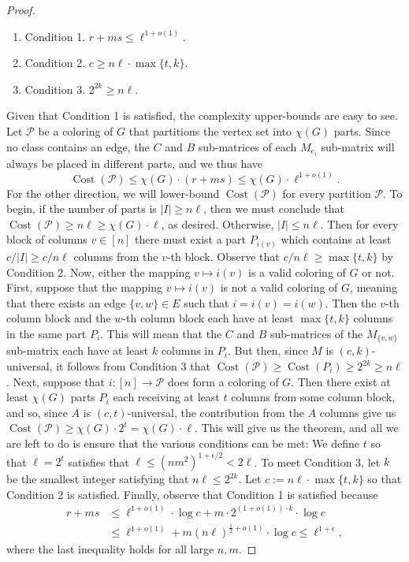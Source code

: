\documentclass[10pt,a4paper]{article}
\begin{document}
\begin{proof}
\begin{enumerate}
\item Condition 1. $r+ms\le\ell^{1+o(1)}$.
\item Condition 2. $c\ge n\ell\cdot\max\{t,k\}$.
\item Condition 3. $2^{2k}\ge n\ell$.
\end{enumerate}
Given that Condition 1 is satisfied, the complexity upper-bounds are easy to see. Let $\mathcal P$ be a coloring of $G$ that partitions the vertex set into $\chi(G)$ parts. Since no class contains an edge, the $C$ and $B$ sub-matrices of each $M_{e_i}$ sub-matrix will always be placed in different parts, and we thus have
\[\operatorname{Cost}(\mathcal P)\le\chi(G)\cdot(r+ms)\le\chi(G)\cdot\ell^{1+o(1)}.\]
For the other direction, we will lower-bound $\operatorname{Cost}(\mathcal P)$ for every partition $\mathcal P$. To begin, if the number of parts is $|I|\ge n\ell$, then we must conclude that $\operatorname{Cost}(\mathcal P)\ge n\ell\ge\chi(G)\cdot\ell$, as desired.
Otherwise, $|I|\le n\ell$. Then for every block of columns $v\in[n]$ there must exist a part $P_{i(v)}$ which contains at least $c/|I|\ge c/n\ell$ columns from the $v$-th block. Observe that $c/n\ell\ge\max\{t,k\}$ by Condition 2.
Now, either the mapping $v\mapsto i(v)$ is a valid coloring of $G$ or not. First, suppose that the mapping $v\mapsto i(v)$ is not a valid coloring of $G$, meaning that there exists an edge $\{v,w\}\in E$ such that $i=i(v)=i(w)$. Then the $v$-th column block and the $w$-th column block each have at least $\max\{t,k\}$ columns in the same part $P_i$. This will mean that the $C$ and $B$ sub-matrices of the $M_{\{v,w\}}$ sub-matrix each have at least $k$ columns in $P_i$. But then, since $M$ is $(c,k)$-universal, it follows from Condition 3 that $\operatorname{Cost}(\mathcal P)\ge\operatorname{Cost}(P_i)\ge2^{2k}\ge n\ell$.
Next, suppose that $i:[n]\to\mathcal P$ does form a coloring of $G$. Then there exist at least $\chi(G)$ parts $P_i$ each receiving at least $t$ columns from some column block, and so, since $A$ is $(c,t)$-universal, the contribution from the $A$ columns give us $\operatorname{Cost}(\mathcal P)\ge\chi(G)\cdot2^t=\chi(G)\cdot\ell$.
This will give us the theorem, and all we are left to do is ensure that the various conditions can be met: We define $t$ so that $\ell=2^t$ satisfies that $\ell\le(nm^2)^{1+\epsilon/2}<2\ell$. To meet Condition 3, let $k$ be the smallest integer satisfying that $n\ell\le2^{2k}$. Let $c:=n\ell\cdot\max\{t,k\}$ so that Condition 2 is satisfied. Finally, observe that Condition 1 is satisfied because
\begin{align*}
r+ms&\le\ell^{1+o(1)}\cdot\log c+m\cdot2^{(1+o(1))\cdot k}\cdot\log c\\
&\le\ell^{1+o(1)}+m(n\ell)^{\frac12+o(1)}\cdot\log c\le\ell^{1+\epsilon},
\end{align*}
where the last inequality holds for all large $n,m$.
\end{proof}
\end{document}

